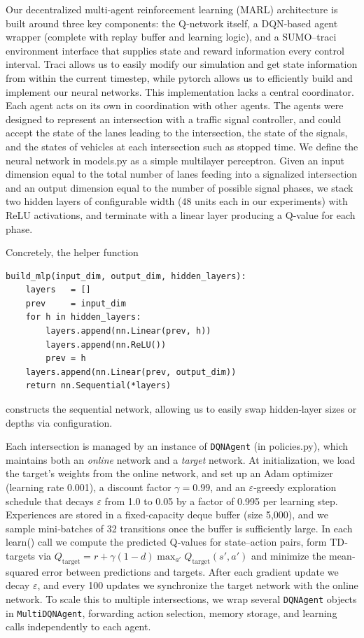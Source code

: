 \documentclass[conference]{IEEEtran}
\begin{document}
Our decentralized multi‐agent reinforcement learning (MARL) architecture is built around three key components: the Q‐network itself, a DQN‐based agent wrapper (complete with replay buffer and learning logic), and a SUMO–traci environment interface that supplies state and reward information every control interval. Traci allows us to easily modify our simulation and get state information from within the current timestep, while pytorch allows us to efficiently build and implement our neural networks. This implementation lacks a central coordinator. Each agent acts on its own in coordination with other agents. The agents were designed to represent an intersection with a traffic signal controller, and could accept the state of the lanes leading to the intersection, the state of the signals, and the states of vehicles at each intersection such as stopped time. We define the neural network in models.py as a simple multilayer perceptron. Given an input dimension equal to the total number of lanes feeding into a signalized intersection and an output dimension equal to the number of possible signal phases, we stack two hidden layers of configurable width (48 units each in our experiments) with ReLU activations, and terminate with a linear layer producing a Q‐value for each phase. 

Concretely, the helper function
\begin{verbatim}
build_mlp(input_dim, output_dim, hidden_layers):
    layers   = []
    prev     = input_dim
    for h in hidden_layers:
        layers.append(nn.Linear(prev, h))
        layers.append(nn.ReLU())
        prev = h
    layers.append(nn.Linear(prev, output_dim))
    return nn.Sequential(*layers)
\end{verbatim}
constructs the sequential network, allowing us to easily swap hidden‐layer sizes or depths via configuration.

Each intersection is managed by an instance of {\tt DQNAgent} (in policies.py), which maintains both an \emph{online} network and a \emph{target} network. At initialization, we load the target’s weights from the online network, and set up an Adam optimizer (learning rate 0.001), a discount factor $\gamma=0.99$, and an $\varepsilon$‐greedy exploration schedule that decays $\varepsilon$ from 1.0 to 0.05 by a factor of 0.995 per learning step. Experiences are stored in a fixed‐capacity deque buffer (size 5,000), and we sample mini‐batches of 32 transitions once the buffer is sufficiently large. In each learn() call we compute the predicted Q‐values for state–action pairs, form TD‐targets via \(Q_{\mathrm{target}} = r + \gamma (1 - d)\max_{a'} Q_{\mathrm{target}}(s', a')\) and minimize the mean‐squared error between predictions and targets. After each gradient update we decay $\varepsilon$, and every 100 updates we synchronize the target network with the online network. To scale this to multiple intersections, we wrap several {\tt DQNAgent} objects in {\tt MultiDQNAgent}, forwarding action selection, memory storage, and learning calls independently to each agent.
\end{document}
